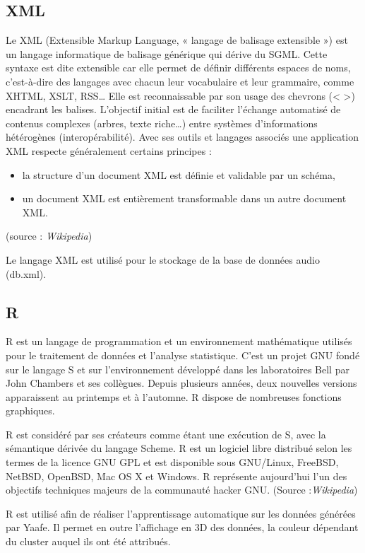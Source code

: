 \documentclass{report}
\begin{document}
\subsection{XML}

Le XML (Extensible Markup Language, « langage de balisage extensible ») est un langage informatique de balisage générique qui dérive du SGML. Cette syntaxe est dite extensible car elle permet de définir différents espaces de noms, c'est-à-dire des langages avec chacun leur vocabulaire et leur grammaire, comme XHTML, XSLT, RSS… Elle est reconnaissable par son usage des chevrons (< >) encadrant les balises. L'objectif initial est de faciliter l'échange automatisé de contenus complexes (arbres, texte riche…) entre systèmes d'informations hétérogènes (interopérabilité). Avec ses outils et langages associés une application XML respecte généralement certains principes :
\begin{itemize}
\item    la structure d'un document XML est définie et validable par un schéma,
\item    un document XML est entièrement transformable dans un autre document XML.
\end{itemize}
(source : \emph{Wikipedia})


Le langage XML est utilisé pour le stockage de la base de données audio (db.xml). 

\subsection{R}

R est un langage de programmation et un environnement mathématique utilisés pour le traitement de données et l'analyse statistique. C'est un projet GNU fondé sur le langage S et sur l'environnement développé dans les laboratoires Bell par John Chambers et ses collègues. Depuis plusieurs années, deux nouvelles versions apparaissent au printemps et à l'automne. R dispose de nombreuses fonctions graphiques.

R est considéré par ses créateurs comme étant une exécution de S, avec la sémantique dérivée du langage Scheme. R est un logiciel libre distribué selon les termes de la licence GNU GPL et est disponible sous GNU/Linux, FreeBSD, NetBSD, OpenBSD, Mac OS X et Windows. R représente aujourd'hui l'un des objectifs techniques majeurs de la communauté hacker GNU. (Source :\emph{Wikipedia})



R est utilisé afin de réaliser l'apprentissage automatique sur les données générées par Yaafe. Il permet en outre l'affichage en 3D des données, la couleur dépendant du cluster auquel ils ont été attribués.
\end{document}
